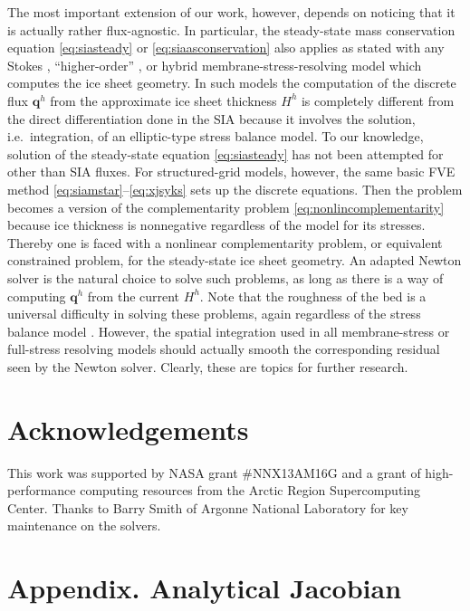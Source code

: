 \documentclass[twocolumn,a4paper]{igs}
\newcommand\bq{\mathbf{q}}
\begin{document}
The most important extension of our work, however, depends on noticing that it is actually rather flux-agnostic.  In particular, the steady-state mass conservation equation \eqref{eq:siasteady} or \eqref{eq:siaasconservation} also applies as stated with any Stokes \citep{GreveBlatter2009}, ``higher-order'' \citep{Pattynetal2008}, or hybrid membrane-stress-resolving \citep{Winkelmannetal2011} model which computes the ice sheet geometry.  In such models the computation of the discrete flux $\bq^h$ from the approximate ice sheet thickness $H^h$ is completely different from the direct differentiation done in the SIA because it involves the solution, i.e.~integration, of an elliptic-type stress balance model.  To our knowledge, solution of the steady-state equation \eqref{eq:siasteady} has not been attempted for other than SIA fluxes.  For structured-grid models, however, the same basic FVE method \eqref{eq:siamstar}--\eqref{eq:xjsyks} sets up the discrete equations.  Then the problem becomes a version of the complementarity problem \eqref{eq:nonlincomplementarity} because ice thickness is nonnegative regardless of the model for its stresses.  Thereby one is faced with a nonlinear complementarity problem, or equivalent constrained problem, for the steady-state ice sheet geometry.  An adapted Newton solver is the natural choice to solve such problems, as long as there is a way of computing $\bq^h$ from the current $H^h$.  Note that the roughness of the bed is a universal difficulty in solving these problems, again regardless of the stress balance model \citep{BrownSmithAhmadia2013}.  However, the spatial integration used in all membrane-stress or full-stress resolving models should actually smooth the corresponding residual seen by the Newton solver.  Clearly, these are topics for further research.


\section*{Acknowledgements}
This work was supported by NASA grant \#NNX13AM16G and a grant of high-performance computing resources from the Arctic Region Supercomputing Center.  Thanks to Barry Smith of Argonne National Laboratory for key maintenance on the solvers.





\appendix
\section{Appendix. Analytical Jacobian}
\end{document}
